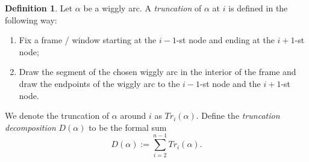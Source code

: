 \documentclass{amsart}
\theoremstyle{definition}
\newtheorem{definition}[theorem]{Definition}
\newcommand{\Z}{\mathbb{Z}} %
\newcommand{\wigglyArcs}{\mathrm{WA}} %
\newcommand{\defn}[1]{\textsl{\color{darkblue} #1}} %
\begin{document}
\begin{definition}
	Let $\alpha$ be a wiggly arc. A \defn{truncation} of $\alpha$ at $i$ is defined in the following way:
	\begin{enumerate}
		\item Fix a frame / window starting at the $i-1$-st node and ending at the $i+1$-st node;
		\item Draw the segment of the chosen wiggly arc in the interior of the frame and draw the endpoints of the wiggly arc to the $i-1$-st node and the $i+1$-st node. 
	\end{enumerate}
	We denote the truncation of $\alpha$ around $i$ as $Tr_i(\alpha)$. Define the \defn{truncation decomposition} $D(\alpha)$ to be the formal sum
		\[
		D(\alpha) := \sum_{i=2}^{n-1} Tr_i(\alpha). %
		\]
\end{definition}
\end{document}
